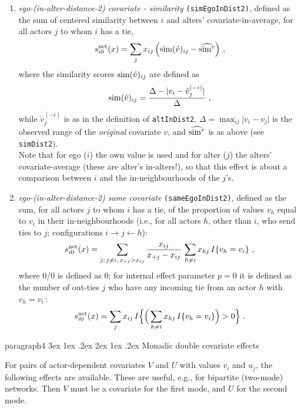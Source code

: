 \documentclass[a4paper,fleqn,11pt]{article}
\makeatletter
\renewcommand\paragraph{\@startsection
   {paragraph}{4}{\z@}               %
   {3ex \@plus1ex \@minus.2ex}       %
   {2ex \@plus1ex \@minus.2ex}       %
   {\normalfont\normalsize\bfseries\itshape}}   %
\newcommand{\+}{\, + \,}
\newcommand{\vit}{\theenumi}
\newcounter{savenumi}
\makeatother
\begin{document}
\begin{enumerate}
\item \emph{ego-(in-alter-distance-2) covariate - similarity} \texttt{(simEgoInDist2)},
      defined as the sum of centered similarity  between $i$
      and alters' covariate-in-average, for all actors
      $j$ to whom $i$ has a tie,
\[
 s^{\rm net}_{i\vit}(x) = \sum_j x_{ij}\, \Big({\rm sim}(\acute v)_{ij}
  - \widehat{{\rm sim}^v} \Big) \ ,
\]
 where the similarity scores ${\rm sim}(\acute v)_{ij}$ are defined as
\[
{\rm sim}(\acute v)_{ij}=
 \frac{\Delta-\vert  v_i - \check v_j^{(-i)} \vert}{\Delta} \ ,
\]
 while
 $ \check v_j^{(-i)}$ is as in the definition of \texttt{altInDist2},
 $\Delta=\max_{ij}\vert v_i - v_j \vert$ is the observed range of the
 \emph{original} covariate $v$, and $\widehat{{\rm sim}^v}$ is as above
 (see \texttt{simDist2}).\\
  Note that for ego ($i$) the own value is used and for alter ($j$) the alters' covariate-average
  (these are alter's in-alters!), so that this effect is about a comparison between $i$
   and the in-neighbourhoods of the $j$'s.

\item \emph{ego-(in-alter-distance-2) same covariate} \texttt{(sameEgoInDist2)},
      defined as the sum, for all actors $j$ to whom $i$ has a tie,
      of the proportion of values $v_h$ equal to $v_i$
      in their in-neighbourhoods (i.e., for all actors $h$, other than $i$,
       who send ties to $j$; configurations $i \rightarrow j \leftarrow h$):
\[
 s^{\rm net}_{i\vit}(x) = \sum_{j;\, j \neq i, \, x_{+j} > x_{ij} } \frac{x_{ij}}{x_{+j} - x_{ij}}
                        \, \sum_{h \neq i} x_{hj}\, I\{v_h = v_i\} \ ,
\]
where 0/0 is defined as 0; for internal effect parameter $p=0$ it is defined
as the number of out-ties $j$ who have any incoming tie from an actor $h$
with $v_h = v_i\,$:
\[
 s^{\rm net}_{i\vit}(x) = \sum_j x_{ij}\,
                I\Big\{  \Big( \sum_{h \neq i} x_{hj}\, I\{v_h = v_i\} \Big) > 0 \Big\} \ .
\]

\setcounter{savenumi}{\value{enumi}}
\end{enumerate}


\paragraph{Monadic double covariate effects}


\noindent
For pairs of actor-dependent covariates $V$ and $U$ with values  $v_i$ and $u_j$,
the following effects are available.
These are useful, e.g., for bipartite (two-mode) networks.
 Then $V$ must be a covariate for the first mode, and $U$ for the second mode.
\end{document}

